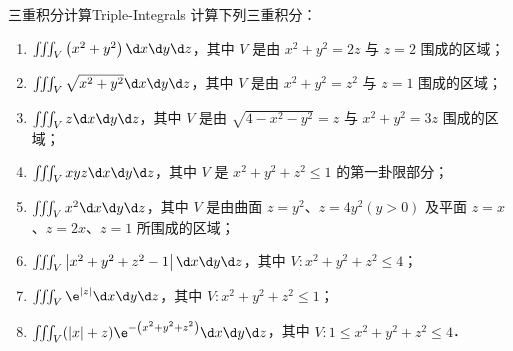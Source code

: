 \begin{problem}{三重积分计算}{Triple-Integrals}
    计算下列三重积分：
    \begin{enumerate}
        \item $\iiint_{V}\left(x^{2}+y^{2}\right) \d x \d y \d z$，其中 $V$ 是由 $x^{2}+y^{2}=2 z$ 与 $z=2$ 围成的区域；
        \item $\iiint_{V} \sqrt{x^{2}+y^{2}} \d x \d y \d z$，其中 $V$ 是由 $x^{2}+y^{2}=z^{2}$ 与 $z=1$ 围成的区域；
        \item $\iiint_{V} z \d x \d y \d z$，其中 $V$ 是由 $\sqrt{4-x^{2}-y^{2}}=z$ 与 $x^{2}+y^{2}=3 z$ 围成的区域；
        \item $\iiint_{V} x y z \d x \d y \d z$，其中 $V$ 是 $x^{2}+y^{2}+z^{2} \le 1$ 的第一卦限部分；
        \item $\iiint_{V} x^{2} \d x \d y \d z$，其中 $V$ 是由曲面 $z=y^{2}$、$z=4 y^{2}(y>0)$ 及平面 $z=x$、$z=2 x$、$z=1$ 所围成的区域；
        \item $\iiint_{V}\left|x^{2}+y^{2}+z^{2}-1\right| \d x \d y \d z$，其中 $V: x^{2}+y^{2}+z^{2} \le 4$；
        \item $\iiint_{V} \e^{|z|} \d x \d y \d z$，其中 $V: x^{2}+y^{2}+z^{2} \le 1$；
        \item $\iiint_{V}(|x|+z) \e^{-\left(x^{2}+y^{2}+z^{2}\right)} \d x \d y \d z$，其中 $V: 1 \le x^{2}+y^{2}+z^{2} \le 4$．
    \end{enumerate}
\end{problem}

